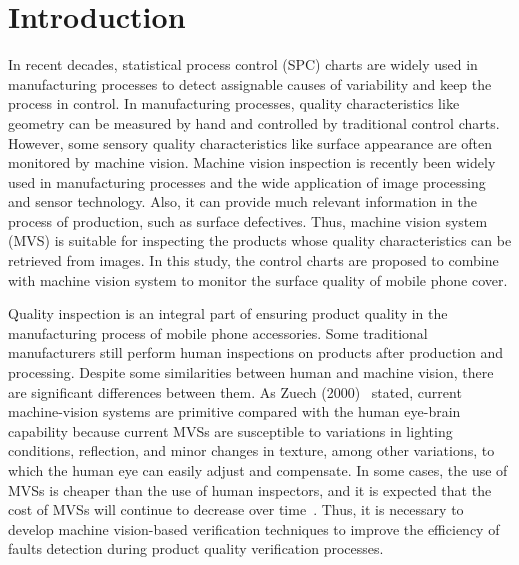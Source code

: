 \chapter{Introduction}
\label{cp:Introduction}
\begin{comment}
Here is the introduction. You need to write the following key points for your work. Keep each part concise and short. In total, this chapter should not be more than four pages.



\begin{itemize}
    \item Background
    \item Motivation
    \item Research gap
    \item Objectives
    \item Approach (in introduction chapter you do not necessarily need to write the results for your work)
    \item The structure of your thesis
\end{itemize}
\end{comment}


In recent decades, statistical process control (SPC) charts
are widely used in manufacturing processes to detect assignable causes of variability and keep the process in control. In manufacturing processes, quality characteristics like geometry can be measured by hand and controlled by traditional control charts. However, some sensory quality characteristics like surface appearance are often monitored by machine vision. Machine vision inspection is recently been widely used in manufacturing processes and the wide application of image processing and sensor technology. Also, it can provide much relevant information in the process of production, such as surface defectives. Thus, machine vision system (MVS) is suitable for inspecting the products whose quality characteristics can be retrieved from images. In this study, the control charts are proposed to combine with machine vision system to monitor the surface quality of mobile phone cover. 

Quality inspection is an integral part of ensuring product quality in the manufacturing process of mobile phone accessories. Some traditional manufacturers still perform human inspections on products after production and processing. Despite some similarities between human and machine vision, there are significant differences between them. As Zuech (2000)~\nocite{zuech2000understanding} stated, current machine-vision systems are primitive compared with the human eye-brain capability because current MVSs are susceptible to variations in lighting conditions, reflection, and minor changes in texture, among other variations, to which the human eye can easily adjust and compensate. In some cases, the use of MVSs is cheaper than the use of human inspectors, and it is expected that the cost of MVSs will continue to decrease over time~\cite{megahed2011review}. Thus, it is necessary to develop machine vision-based verification techniques to improve the efficiency of faults detection during product quality verification processes. 



